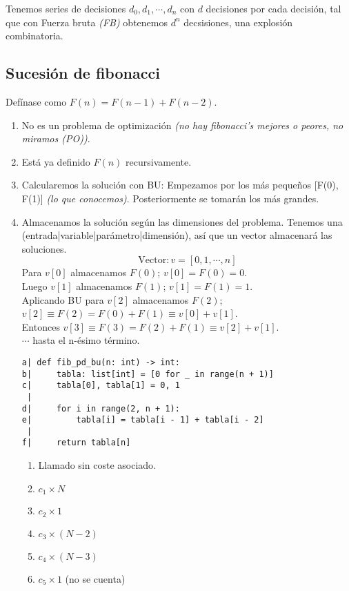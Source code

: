 \documentclass[tikz,11pt,fleqn]{book} %
\begin{document}
Tenemos series de decisiones $d_0,d_1,\cdots,d_n$ con $d$ decisiones por cada decisión, tal que con Fuerza bruta \textit{(FB)} obtenemos $d^n$ decsisiones, una explosión combinatoria.

\subsection{Sucesión de fibonacci}
\begin{example}
	Defínase como $F(n)=F(n-1)+F(n-2)$.
	\begin{enumerate}
		\item No es un problema de optimización \textit{(no hay fibonacci's mejores o peores, no miramos (PO))}.
		\item Está ya definido $F(n)$ recursivamente.
		\item Calcularemos la solución con BU:
		      Empezamos por los más pequeños [F(0), F(1)] \textit{(lo que conocemos)}. Posteriormente se tomarán los más grandes.
		\item Almacenamos la solución según las dimensiones del problema. Tenemos una (entrada|variable|parámetro|dimensión), así que un vector almacenará las soluciones.
		      $$\text{Vector}:v=[0, 1, \cdots,n]$$
		      Para $v[0]$ almacenamos $F(0)$; $v[0]=F(0)=0$.\\
		      Luego $v[1]$ almacenamos $F(1)$; $v[1]=F(1)=1$.\\
		      Aplicando BU para $v[2]$ almacenamos $F(2)$; $v[2]\equiv F(2)=F(0)+F(1)\equiv v[0]+v[1]$.\\
		      Entonces $v[3]\equiv F(3)=F(2)+F(1)\equiv v[2]+v[1]$.\\
		      $\cdots$ hasta el n-ésimo término.

		      \begin{multicols}{2}
			      \begin{lstlisting}
a| def fib_pd_bu(n: int) -> int:
b|     tabla: list[int] = [0 for _ in range(n + 1)]
c|     tabla[0], tabla[1] = 0, 1
 | 
d|     for i in range(2, n + 1):
e|         tabla[i] = tabla[i - 1] + tabla[i - 2]
 | 
f|     return tabla[n]
\end{lstlisting}
			      \columnbreak
			      \begin{enumerate}
				      \item Llamado sin coste asociado.
				      \item $c_1\times N$
				      \item $c_2\times1$
				      \item $c_3\times (N-2)$
				      \item $c_4\times (N-3)$
				      \item $c_5\times1$ (no se cuenta)
			      \end{enumerate}
		      \end{multicols}


\end{enumerate}
\end{example}
\end{document}
